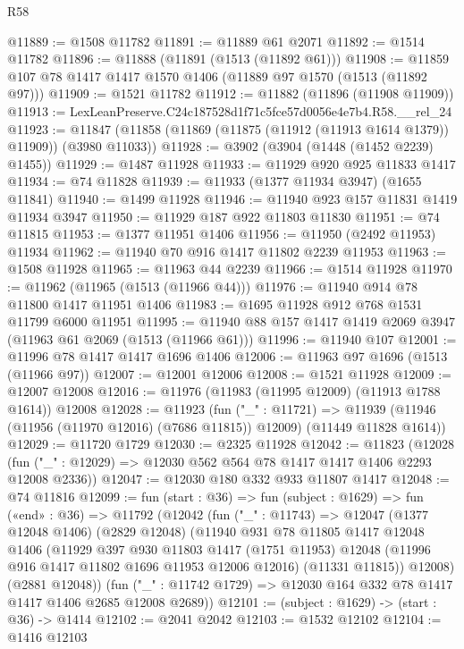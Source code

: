 \begin{lexlean}{R58}
\begin{coremodule}
{{@11889 := @1508 @11782
@11891 := @11889 @61 @2071
@11892 := @1514 @11782
@11896 := @11888 (@11891 (@1513 (@11892 @61)))
@11908 := @11859 @107 @78 @1417 @1417 @1570 @1406 (@11889 @97 @1570 (@1513 (@11892 @97)))
@11909 := @1521 @11782
@11912 := @11882 (@11896 (@11908 @11909))
@11913 := LexLeanPreserve.C24c187528d1f71c5fce57d0056e4e7b4.R58.__rel_24
@11923 := @11847 (@11858 (@11869 (@11875 (@11912 (@11913 @1614 @1379)) @11909)) (@3980 @11033))
@11928 := @3902 (@3904 (@1448 (@1452 @2239) @1455))
@11929 := @1487 @11928
@11933 := @11929 @920 @925 @11833 @1417
@11934 := @74 @11828
@11939 := @11933 (@1377 @11934 @3947) (@1655 @11841)
@11940 := @1499 @11928
@11946 := @11940 @923 @157 @11831 @1419 @11934 @3947
@11950 := @11929 @187 @922 @11803 @11830
@11951 := @74 @11815
@11953 := @1377 @11951 @1406
@11956 := @11950 (@2492 @11953) @11934
@11962 := @11940 @70 @916 @1417 @11802 @2239 @11953
@11963 := @1508 @11928
@11965 := @11963 @44 @2239
@11966 := @1514 @11928
@11970 := @11962 (@11965 (@1513 (@11966 @44)))
@11976 := @11940 @914 @78 @11800 @1417 @11951 @1406
@11983 := @1695 @11928 @912 @768 @1531 @11799 @6000 @11951
@11995 := @11940 @88 @157 @1417 @1419 @2069 @3947 (@11963 @61 @2069 (@1513 (@11966 @61)))
@11996 := @11940 @107
@12001 := @11996 @78 @1417 @1417 @1696 @1406
@12006 := @11963 @97 @1696 (@1513 (@11966 @97))
@12007 := @12001 @12006
@12008 := @1521 @11928
@12009 := @12007 @12008
@12016 := @11976 (@11983 (@11995 @12009) (@11913 @1788 @1614)) @12008
@12028 := @11923
    (fun ("_" : @11721) =>
    @11939 (@11946 (@11956 (@11970 @12016) (@7686 @11815)) @12009) (@11449 @11828 @1614))
@12029 := @11720 @1729
@12030 := @2325 @11928
@12042 := @11823
    (@12028 (fun ("_" : @12029) => @12030 @562 @564 @78 @1417 @1417 @1406 @2293 @12008 @2336))
@12047 := @12030 @180 @332 @933 @11807 @1417
@12048 := @74 @11816
@12099 := fun (start : @36) =>
  fun (subject : @1629) =>
  fun («end» : @36) =>
  @11792
    (@12042
      (fun ("_" : @11743) =>
      @12047
        (@1377 @12048 @1406)
        (@2829 @12048)
        (@11940
          @931
          @78
          @11805
          @1417
          @12048
          @1406
          (@11929
            @397
            @930
            @11803
            @1417
            (@1751 @11953)
            @12048
            (@11996 @916 @1417 @11802 @1696 @11953 @12006 @12016)
            (@11331 @11815))
          @12008)
        (@2881 @12048))
      (fun ("_" : @11742 @1729) => @12030 @164 @332 @78 @1417 @1417 @1406 @2685 @12008 @2689))
@12101 := (subject : @1629) -> (start : @36) -> @1414
@12102 := @2041 @2042
@12103 := @1532 @12102
@12104 := @1416 @12103
}}
\end{coremodule}
\end{lexlean}
